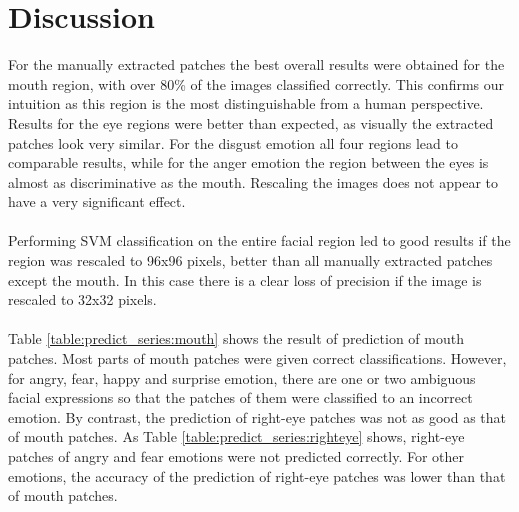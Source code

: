 \section{Discussion}
For the manually extracted patches the best overall results were obtained for the mouth region, with over 80\% of the images classified correctly.
This confirms our intuition as this region is the most distinguishable
from a human perspective. Results for the eye regions were better than expected, as visually the extracted patches look very similar. For the disgust emotion all
four regions lead to comparable results, while for the anger emotion the region between the eyes is almost as discriminative as the mouth.
Rescaling the images does not appear to have a very significant effect.
\\
\\
Performing SVM classification on the entire facial region led to good results if the region was rescaled to 96x96 pixels, better than all manually extracted
patches except the mouth. In this case there is a clear loss
of precision if the image is rescaled to 32x32 pixels.
\\
\\
Table \ref{table:predict_series:mouth} shows the result of prediction of mouth patches. Most parts of mouth patches were given correct classifications. However, for angry, fear, happy and surprise emotion, there are one or two ambiguous facial expressions so that the patches of them were classified to an incorrect emotion. By contrast, the prediction of right-eye patches was not as good as that of mouth patches. As Table \ref{table:predict_series:righteye} shows, right-eye patches of angry and fear emotions were not predicted correctly. For other emotions, the accuracy of the prediction of right-eye patches was lower than that of mouth patches.%
\\
\\


